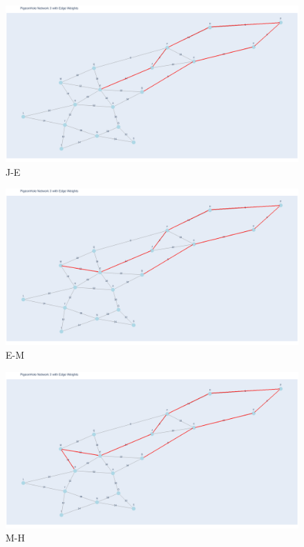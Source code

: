 \documentclass[11pt]{book}
\renewcommand{\=}[1]{\stackrel{#1}{=}} %
\theoremstyle{definition}
\theoremstyle{remark}
\begin{document}
\begin{figure}
    \centering
    \includegraphics[width=1\linewidth]{q5_plots/7.png}
    \caption{J-E}
    \label{fig:enter-label}
\end{figure}
\begin{figure}
    \centering
    \includegraphics[width=1\linewidth]{q5_plots/8.png}
    \caption{E-M}
    \label{fig:enter-label}
\end{figure}
\begin{figure}
    \centering
    \includegraphics[width=1\linewidth]{q5_plots/9.png}
    \caption{M-H}
    \label{fig:enter-label}
\end{figure}
\end{document}
